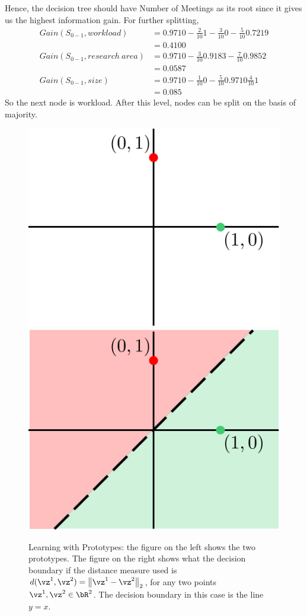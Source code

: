 \documentclass[a4paper,11pt]{article}
\begin{document}
\begin{mlsolution}
Hence, the decision tree should have Number of Meetings as its root since it gives us the highest information gain. For further splitting,
\begin{align*}
	Gain(S_{0-1}, workload) &= 0.9710 - \frac{2}{10}1 - \frac{3}{10}0 - \frac{5}{10}0.7219\\
	&= 0.4100\\
	Gain(S_{0-1}, research\ area) &= 0.9710 - \frac{3}{10}0.9183 - \frac{7}{10}0.9852\\
	&= 0.0587\\
	Gain(S_{0-1}, size) &= 0.9710 - \frac{1}{10}0 - \frac{5}{10}0.9710 \frac{4}{10}1\\
		&= 0.085
\end{align*}
So the next node is workload. After this level, nodes can be split on the basis of majority.
\begin{figure}[th]%
	\centering
	\includegraphics[width=0.5\columnwidth]{proto_blank.png}%
	\hfill
	\includegraphics[width=0.5\columnwidth]{proto_euclid_sample.png}%
	\caption{Learning with Prototypes: the figure on the left shows the two prototypes. The figure on the right shows what the decision boundary if the distance measure used is $d(\vz^1,\vz^2) = \norm{\vz^1-\vz^2}_2$, for any two points $\vz^1,\vz^2 \in \bR^2$. The decision boundary in this case is the line $y = x$.}%
	\label{fig:proto}%
\end{figure}
\end{mlsolution}


\end{document}

